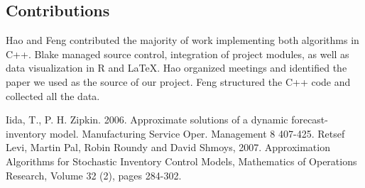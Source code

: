 \documentclass[twoside]{article}
\begin{document}
\begin{multicols}{2}
\section{Contributions}
Hao and Feng contributed the majority of work implementing both algorithms in C++. Blake managed source control, integration of project modules, as well as data visualization in R and \LaTeX. Hao organized meetings and identified the paper we used as the source of our project. Feng structured the C++ code and collected all the data.



\begin{thebibliography}{99} %

Iida, T., P. H. Zipkin. 2006. Approximate solutions of a dynamic forecast-inventory model. Manufacturing Service Oper. Management
8 407-425.
Retsef Levi, Martin Pal, Robin Roundy and David Shmoys, 2007. Approximation Algorithms for Stochastic Inventory Control Models, Mathematics of Operations Research, Volume 32 (2), pages 284-302.

\end{thebibliography}


\end{multicols}
\end{document}
